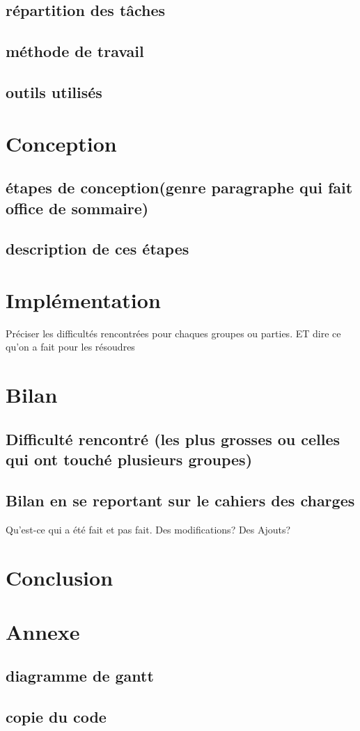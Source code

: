 \documentclass{report}
\begin{document}
    \section{répartition des tâches}
    \section{méthode de travail}
    \section{outils utilisés}
\chapter{Conception}
\section{étapes de conception(genre paragraphe qui fait office de sommaire)}
\section{description de ces étapes}

\chapter{Implémentation}
Préciser les difficultés rencontrées pour chaques groupes ou parties. ET dire ce qu'on a fait pour les résoudres


\chapter{Bilan}
    \section{Difficulté rencontré (les plus grosses ou celles qui ont touché plusieurs groupes)}
    \section{Bilan en se reportant sur le cahiers des charges}
    Qu'est-ce qui a été fait et pas fait. Des modifications? Des Ajouts?
    
\chapter{Conclusion}

\chapter{Annexe}
    \section{diagramme de gantt}
    \section{copie du code}
\end{document}
